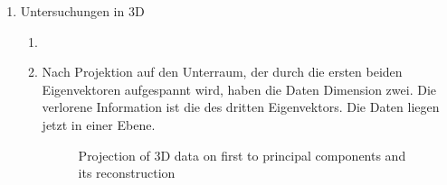 \documentclass[]{report}
\newlength\figureheight
\begin{document}
\begin{enumerate}
	\item Untersuchungen in 3D
	\begin{enumerate}
		\item
		
		\item
		Nach Projektion auf den Unterraum, der durch die ersten beiden Eigenvektoren aufgespannt wird, haben die Daten Dimension zwei. Die verlorene Information ist die des dritten Eigenvektors. Die Daten liegen jetzt in einer Ebene.
		\setlength\figureheight{10cm}
		\begin{figure}[tbp!]
			\centering
			
			\caption{Projection of 3D data on first to principal components and its reconstruction} 
			\label{fig:3D projection and reconstruction}
		\end{figure}
	\end{enumerate}
	

\end{enumerate}
\end{document}
